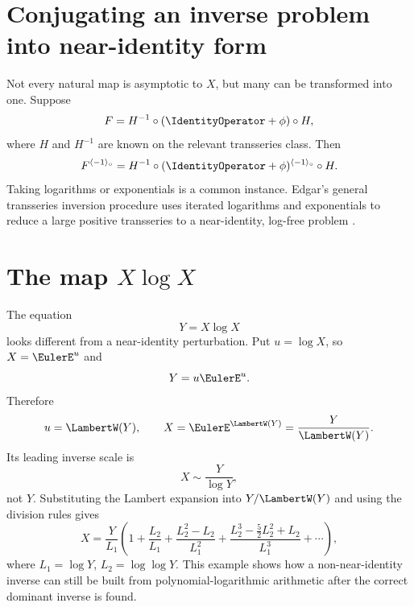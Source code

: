 \documentclass[11pt,oneside,openany]{book}
\newcommand{\compose}{\mathbin{\circ}}
\newcommand{\rev}{^{\langle-1\rangle_{\circ}}}
\begin{document}
\section{Conjugating an inverse problem into near-identity form}
Not every natural map is asymptotic to \(X\), but many can be transformed into
one.  Suppose
\begin{equation}\label{eq:conjugateproblem}
 F=H^{-1}\compose(\IdentityOperator+\phi)\compose H,
\end{equation}
where \(H\) and \(H^{-1}\) are known on the relevant transseries class.  Then
\begin{equation}\label{eq:conjugateinverse}
 F\rev=H^{-1}\compose(\IdentityOperator+\phi)\rev\compose H.
\end{equation}
Taking logarithms or exponentials is a common instance.  Edgar's general
transseries inversion procedure uses iterated logarithms and exponentials to
reduce a large positive transseries to a near-identity, log-free problem
\cite{EdgarComposition,EdgarBeginners}.

\section{The map \texorpdfstring{\(X\log X\)}{X log X}}
The equation
\begin{equation}\label{eq:XlogXeq}
 Y=X\log X
\end{equation}
looks different from a near-identity perturbation.  Put \(u=\log X\), so
\(X=\EulerE^u\) and
\[
 Y=u\EulerE^u.
\]
Therefore
\begin{equation}\label{eq:XlogXexact}
 u=\LambertW(Y),
 \qquad
 X=\EulerE^{\LambertW(Y)}=\frac{Y}{\LambertW(Y)}.
\end{equation}
Its leading inverse scale is
\begin{equation}\label{eq:XlogXleading}
 X\sim\frac{Y}{\log Y},
\end{equation}
not \(Y\).  Substituting the Lambert expansion into \(Y/\LambertW(Y)\) and using the
division rules gives
\begin{equation}\label{eq:XlogXexpansion}
 X=\frac{Y}{L_1}\left(
 1+\frac{L_2}{L_1}
 +\frac{L_2^2-L_2}{L_1^2}
 +\frac{L_2^3-\frac52L_2^2+L_2}{L_1^3}
 +\cdots
 \right),
\end{equation}
where \(L_1=\log Y\), \(L_2=\log\log Y\).  This example shows how a
non-near-identity inverse can still be built from polynomial-logarithmic
arithmetic after the correct dominant inverse is found.
\end{document}
